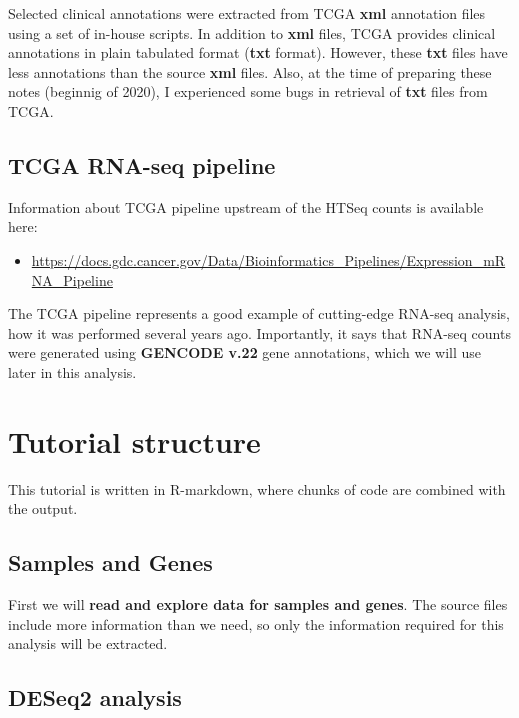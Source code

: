 \documentclass[]{book}
\providecommand{\tightlist}{%
  \setlength{\itemsep}{0pt}\setlength{\parskip}{0pt}}
\begin{document}
Selected clinical annotations were extracted from TCGA \textbf{xml}
annotation files using a set of in-house scripts. In addition to
\textbf{xml} files, TCGA provides clinical annotations in plain
tabulated format (\textbf{txt} format). However, these \textbf{txt}
files have less annotations than the source \textbf{xml} files. Also, at
the time of preparing these notes (beginnig of 2020), I experienced some
bugs in retrieval of \textbf{txt} files from TCGA.

\subsection{TCGA RNA-seq pipeline}\label{tcga-rna-seq-pipeline}

Information about TCGA pipeline upstream of the HTSeq counts is
available here:

\begin{itemize}
\tightlist
\item
  \url{https://docs.gdc.cancer.gov/Data/Bioinformatics_Pipelines/Expression_mRNA_Pipeline}
\end{itemize}

The TCGA pipeline represents a good example of cutting-edge RNA-seq
analysis, how it was performed several years ago. Importantly, it says
that RNA-seq counts were generated using \textbf{GENCODE v.22} gene
annotations, which we will use later in this analysis.

\section{Tutorial structure}\label{tutorial-structure}

This tutorial is written in R-markdown, where chunks of code are
combined with the output.

\subsection{Samples and Genes}\label{samples-and-genes}

First we will \textbf{read and explore data for samples and genes}. The
source files include more information than we need, so only the
information required for this analysis will be extracted.

\subsection{DESeq2 analysis}\label{deseq2-analysis}
\end{document}

